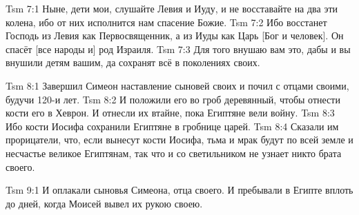 \vs Tsm 7:1
Ныне, дети мои, слушайте Левия и Иуду,
и не восставайте на два эти колена,
ибо от них исполнится нам спасение Божие.
\vs Tsm 7:2
Ибо восстанет Господь из Левия как Первосвященник,
а из Иуды как Царь [Бог и человек].
Он спасёт [все народы и] род Израиля.
\vs Tsm 7:3
Для того внушаю вам это, дабы и вы внушили детям вашим,
да сохранят всё в поколениях своих.

\vs Tsm 8:1
Завершил Симеон наставление сыновей своих и почил с отцами
своими, будучи 120-и лет.
\vs Tsm 8:2
И положили его во гроб деревянный,
чтобы отнести кости его в Хеврон.
И отнесли их втайне, пока Египтяне вели войну.
\vs Tsm 8:3
Ибо кости Иосифа сохранили Египтяне в гробнице царей.
\vs Tsm 8:4
Сказали им прорицатели, что, если вынесут кости Иосифа,
тьма и мрак будут по всей земле и несчастье великое Египтянам,
так что и со светильником не узнает никто брата своего.

\vs Tsm 9:1
И оплакали сыновья Симеона, отца своего.
И пребывали в Египте вплоть до дней, когда Моисей вывел их рукою своею.
